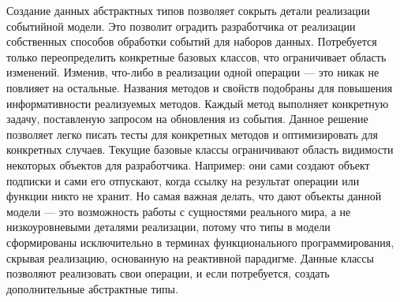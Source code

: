 Создание данных абстрактных типов позволяет сокрыть детали реализации событийной модели. Это позволит оградить разработчика от реализации собственных способов обработки
событий для наборов данных. Потребуется только переопределить конкретные базовых классов, что ограничивает область изменений.
Изменив, что-либо в реализации одной операции --- это никак не повлияет на остальные. Названия методов и свойств подобраны для повышения информативности реализуемых методов.
Каждый метод выполняет конкретную задачу, поставленую запросом на обновления из события. Данное решение позволяет легко писать тесты для конкретных методов и оптимизировать для
конкретных случаев. Текущие базовые классы ограничивают область видимости некоторых объектов для разработчика. Например: они сами создают объект подписки и сами его отпускают, когда
ссылку на результат операции или функции никто не хранит. Но самая важная делать, что дают объекты данной модели --- это возможность работы с сущностями реального мира,
а не низкоуровневыми деталями реализации, потому что типы в модели сформированы исключительно в терминах функционального программирования, скрывая реализацию, основанную на реактивной парадигме.
Данные классы позволяют реализовать свои операции, и если потребуется, создать дополнительные абстрактные типы.
